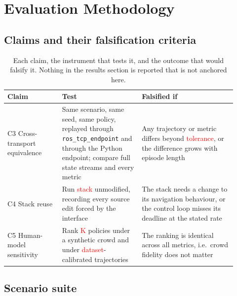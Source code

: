\documentclass[pdflatex,sn-mathphys-num]{template/sn-jnl}%
\newcommand{\ph}[1]{\textcolor{red}{\langle #1\rangle}}
\begin{document}
\section{Evaluation Methodology}
\label{sec:method}

\subsection{Claims and their falsification criteria}
\label{sec:method:claims}

\begin{table}[t]
  \centering
  \caption{Each claim, the instrument that tests it, and the outcome that
  would falsify it. Nothing in the results section is reported that is not
  anchored here.}
  \label{tab:claims}
  \begin{tabular}{p{0.22\linewidth}p{0.32\linewidth}p{0.38\linewidth}}
    \toprule
    Claim & Test & Falsified if \\
    \midrule
    C3 Cross-transport equivalence
      & Same scenario, same seed, same policy, replayed through
        \texttt{ros\_tcp\_endpoint} and through the Python endpoint; compare
        full state streams and every metric
      & Any trajectory or metric differs beyond \ph{tolerance}, or the
        difference grows with episode length \\
    C4 Stack reuse
      & Run \ph{stack} unmodified, recording every source edit forced by the
        interface
      & The stack needs a change to its navigation behaviour, or the control
        loop misses its deadline at the stated rate \\
    C5 Human-model sensitivity
      & Rank \ph{K} policies under a synthetic crowd and under
        \ph{dataset}-calibrated trajectories
      & The ranking is identical across all metrics, i.e.\ crowd fidelity
        does not matter \\
    \bottomrule
  \end{tabular}
\end{table}

\subsection{Scenario suite}
\label{sec:method:scenarios}
\end{document}
